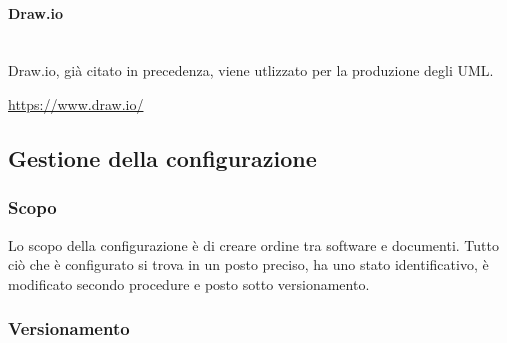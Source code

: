 		\paragraph{Draw.io} \mbox{}\\
		Draw.io, già citato in precedenza, viene utlizzato per la produzione degli UML. \newline
		\centerline{\url{https://www.draw.io/}}
		
	\subsection{Gestione della configurazione}
	\subsubsection{Scopo}
	Lo scopo della configurazione è di creare ordine tra software e documenti. Tutto ciò che è configurato si trova in un posto preciso, ha uno stato identificativo, è modificato secondo procedure e posto sotto versionamento.
	\subsubsection{Versionamento}
